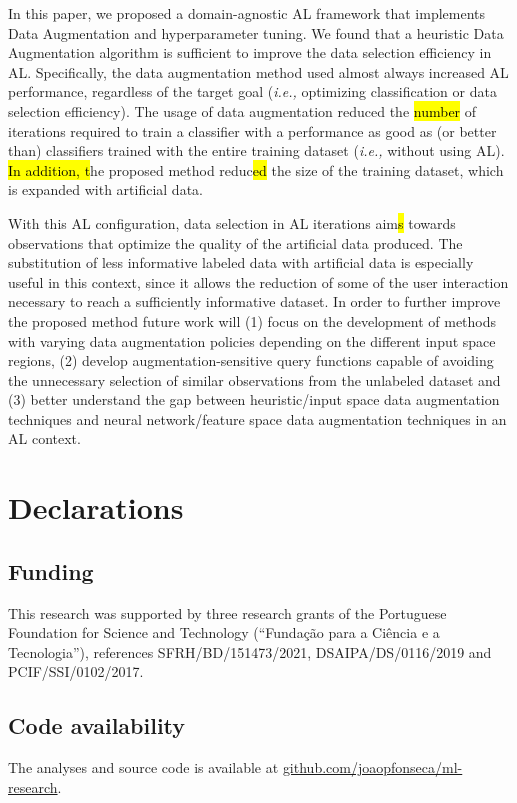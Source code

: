 \documentclass[preprint, 12pt]{elsarticle}
\begin{document}
In this paper, we proposed a domain-agnostic AL framework that implements Data
Augmentation and hyperparameter tuning. We found that a heuristic Data
Augmentation algorithm is sufficient to improve the data selection efficiency
in AL\@. Specifically, the data augmentation method used almost always
increased AL performance, regardless of the target goal (\textit{i.e.,}
optimizing classification or data selection efficiency). The usage of data
augmentation reduced the \hl{number} of iterations required to train a
classifier with a performance as good as (or better than) classifiers trained
with the entire training dataset (\textit{i.e.,} without using AL). \hl{In
addition, t}he proposed method reduc\hl{ed} the size of the training dataset,
which is expanded with artificial data. 

With this AL configuration, data selection in AL iterations aim\hl{s} towards
observations that optimize the quality of the artificial data produced. The
substitution of less informative labeled data with artificial data is
especially useful in this context, since it allows the reduction of some of
the user interaction necessary to reach a sufficiently informative dataset.
In order to further improve the proposed method future work will (1) focus on
the development of methods with varying data augmentation policies depending
on the different input space regions, (2) develop augmentation-sensitive query
functions capable of avoiding the unnecessary selection of similar
observations from the unlabeled dataset and (3) better understand the gap
between heuristic/input space data augmentation techniques and neural
network/feature space data augmentation techniques in an AL context.

\section*{Declarations}

\subsection*{Funding}

This research was supported by three research grants of the Portuguese Foundation
for Science and Technology (``Fundação para a Ciência e a Tecnologia''),
references SFRH/BD/151473/2021, DSAIPA/DS/0116/2019 and PCIF/SSI/0102/2017.

\subsection*{Code availability}

The analyses and source code is available at
\href{https://github.com/joaopfonseca/ml-research}{github.com/joaopfonseca/ml-research}.



\end{document}
